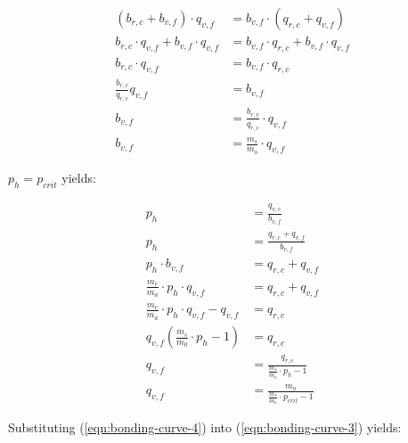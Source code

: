 \documentclass[table, twocolumn]{article}
\begin{document}
\begin{align} \label{eqn:bonding-curve-3}
  (b_{r, c} + b_{v, f}) \cdot q_{v, f}              & =
  b_{v, f} \cdot (q_{r, c} + q_{v, f}) \nonumber              \\
  b_{r, c} \cdot q_{v, f} + b_{v, f} \cdot q_{v, f} & =
  b_{v, f} \cdot q_{r, c} + b_{v, f} \cdot q_{v, f} \nonumber \\
  b_{r, c} \cdot q_{v, f}                           & =
  b_{v, f} \cdot q_{r, c} \nonumber                           \\
  \frac{b_{r, c}}{q_{r, c}} q_{v, f}                & =
  b_{v, f} \nonumber                                          \\
  b_{v, f}                                          & =
  \frac{b_{r, c}}{q_{r, c}} \cdot q_{v, f} \nonumber          \\
  b_{v, f}                                          & =
  \frac{m_s}{m_o} \cdot q_{v, f}
\end{align}

$p_h = p_{crit}$ yields:

\begin{align} \label{eqn:bonding-curve-4}
  p_h                                                 & =
  \frac{q_{v, c}}{b_{v, f}} \nonumber                      \\
  p_h                                                 & =
  \frac{q_{r, c} + q_{v, f}}{b_{v, f}} \nonumber           \\
  p_h \cdot b_{v, f}                                  & =
  q_{r, c} + q_{v, f} \nonumber                            \\
  \frac{m_e}{m_a} \cdot p_h \cdot q_{v, f}            & =
  q_{r, c} + q_{v, f} \nonumber                            \\
  \frac{m_e}{m_a} \cdot p_h \cdot q_{v, f} - q_{v, f} & =
  q_{r, c} \nonumber                                       \\
  q_{v, f} (\frac{m_s}{m_0} \cdot p_h - 1)            & =
  q_{r, c} \nonumber                                       \\
  q_{v, f}                                            & =
  \frac{q_{r, c}}{\frac{m_s}{m_o} \cdot p_h - 1} \nonumber \\
  q_{v, f}                                            & =
  \frac{m_o}{\frac{m_s}{m_o} \cdot p_{crit} - 1}
\end{align}

Substituting (\ref{eqn:bonding-curve-4}) into (\ref{eqn:bonding-curve-3}) yields:
\end{document}
